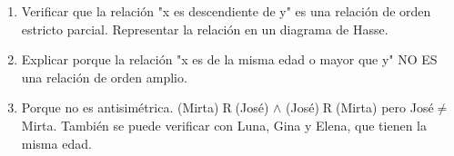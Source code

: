 \documentclass[a4paper]{article}
\newcommand{\answer}{\item[**]}
\begin{document}
\begin{enumerate}
\begin{enumerate} [label=(\alph*)]
		\item Verificar que la relación "x es descendiente de y" es una relación de orden estricto parcial. Representar la relación en un diagrama de Hasse.
		
		\item Explicar porque la relación "x es de la misma edad o mayor que y" NO ES una relación de orden amplio.
		\answer Porque no es antisimétrica. (Mirta)$\mathrel{R}$(José) $\land$ (José)$\mathrel{R}$(Mirta) pero José$\neq$Mirta. También se puede verificar con Luna, Gina y Elena, que tienen la misma edad.
	
	\end{enumerate}

\end{enumerate}
\end{document}
